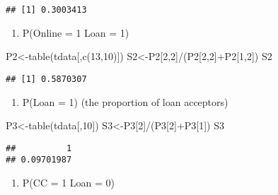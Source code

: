 \documentclass[
]{article}
\newenvironment{Shaded}{\begin{snugshade}}{\end{snugshade}}
\newcommand{\DecValTok}[1]{\textcolor[rgb]{0.00,0.00,0.81}{#1}}
\newcommand{\FunctionTok}[1]{\textcolor[rgb]{0.00,0.00,0.00}{#1}}
\newcommand{\NormalTok}[1]{#1}
\newcommand{\OtherTok}[1]{\textcolor[rgb]{0.56,0.35,0.01}{#1}}
\newcommand{\SpecialCharTok}[1]{\textcolor[rgb]{0.00,0.00,0.00}{#1}}
\providecommand{\tightlist}{%
  \setlength{\itemsep}{0pt}\setlength{\parskip}{0pt}}
\begin{document}
\begin{verbatim}
## [1] 0.3003413
\end{verbatim}

\begin{enumerate}
\def\labelenumi{\roman{enumi}.}
\setcounter{enumi}{1}
\tightlist
\item
  P(Online = 1 \textbar{} Loan = 1)
\end{enumerate}

\begin{Shaded}
\begin{Highlighting}[]
\NormalTok{P2}\OtherTok{\textless{}{-}}\FunctionTok{table}\NormalTok{(tdata[,}\FunctionTok{c}\NormalTok{(}\DecValTok{13}\NormalTok{,}\DecValTok{10}\NormalTok{)])}
\NormalTok{S2}\OtherTok{\textless{}{-}}\NormalTok{P2[}\DecValTok{2}\NormalTok{,}\DecValTok{2}\NormalTok{]}\SpecialCharTok{/}\NormalTok{(P2[}\DecValTok{2}\NormalTok{,}\DecValTok{2}\NormalTok{]}\SpecialCharTok{+}\NormalTok{P2[}\DecValTok{1}\NormalTok{,}\DecValTok{2}\NormalTok{])}
\NormalTok{S2}
\end{Highlighting}
\end{Shaded}

\begin{verbatim}
## [1] 0.5870307
\end{verbatim}

\begin{enumerate}
\def\labelenumi{\roman{enumi}.}
\setcounter{enumi}{2}
\tightlist
\item
  P(Loan = 1) (the proportion of loan acceptors)
\end{enumerate}

\begin{Shaded}
\begin{Highlighting}[]
\NormalTok{P3}\OtherTok{\textless{}{-}}\FunctionTok{table}\NormalTok{(tdata[,}\DecValTok{10}\NormalTok{])}
\NormalTok{S3}\OtherTok{\textless{}{-}}\NormalTok{P3[}\DecValTok{2}\NormalTok{]}\SpecialCharTok{/}\NormalTok{(P3[}\DecValTok{2}\NormalTok{]}\SpecialCharTok{+}\NormalTok{P3[}\DecValTok{1}\NormalTok{])}
\NormalTok{S3}
\end{Highlighting}
\end{Shaded}

\begin{verbatim}
##          1 
## 0.09701987
\end{verbatim}

\begin{enumerate}
\def\labelenumi{\roman{enumi}.}
\setcounter{enumi}{3}
\tightlist
\item
  P(CC = 1 \textbar{} Loan = 0)
\end{enumerate}
\end{document}
